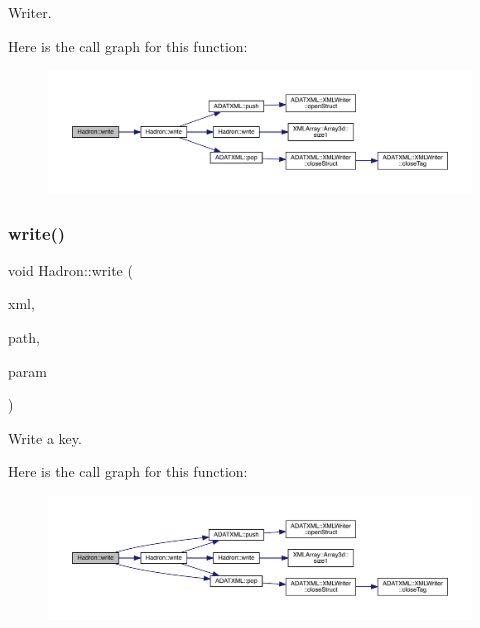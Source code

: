 Writer. 

Here is the call graph for this function\+:\nopagebreak
\begin{figure}[H]
\begin{center}
\leavevmode
\includegraphics[width=350pt]{d1/daf/namespaceHadron_aca06b6220f81ed284c829138c237b84e_cgraph}
\end{center}
\end{figure}
\mbox{\label{namespaceHadron_ad598d89ca80f65de661af491b2ee51e2}} 
\subsubsection{\texorpdfstring{write()}{write()}\hspace{0.1cm}{\footnotesize\ttfamily [89/95]}}
{\footnotesize\ttfamily void Hadron\+::write (\begin{DoxyParamCaption}\item[{\mbox{\hyperlink{classADATXML_1_1XMLWriter}{X\+M\+L\+Writer}} \&}]{xml,  }\item[{const std\+::string \&}]{path,  }\item[{const \mbox{\hyperlink{structHadron_1_1KeySingleHadronQuarkDeriv__t}{Key\+Single\+Hadron\+Quark\+Deriv\+\_\+t}} \&}]{param }\end{DoxyParamCaption})}



Write a key. 

Here is the call graph for this function\+:\nopagebreak
\begin{figure}[H]
\begin{center}
\leavevmode
\includegraphics[width=350pt]{d1/daf/namespaceHadron_ad598d89ca80f65de661af491b2ee51e2_cgraph}
\end{center}
\end{figure}
\mbox{\label{namespaceHadron_a3d7c7b8fcc5310fee44294d5900816fb}} 
